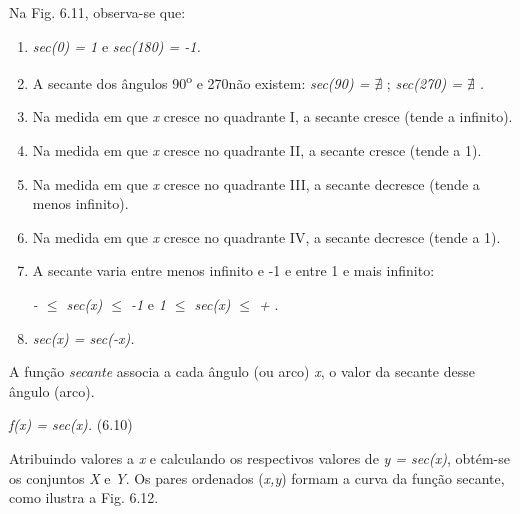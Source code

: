 Na Fig. 6.11, observa-se que:

\begin{caixa}
\begin{enumerate}
    \item \textit{sec(0\degree) = 1}   e  \textit{sec(180\degree) = -1.}

    \item A secante dos ângulos 90\textsuperscript{o} e 270\degree não existem: \textit{sec(90\degree) =  \(  \nexists  \) };  \textit{sec(270\degree) =  \(  \nexists  \) .}

    \item Na medida em que \textit{x} cresce no quadrante I, a secante cresce (tende a infinito).

    \item Na medida em que \textit{x} cresce no quadrante II, a secante cresce (tende a 1).

    \item Na medida em que \textit{x} cresce no quadrante III, a secante decresce (tende a menos infinito).

    \item Na medida em que \textit{x} cresce no quadrante IV, a secante decresce (tende a 1).

    \item A secante varia entre menos infinito e -1 e entre 1 e mais infinito: 

 \textit{-  $ \leq $  sec(x) $ \leq $  -1  }e\textit{   1 $ \leq $  sec(x) $ \leq $  +   }.

    \item \textit{ sec(x) = sec(-x).}
\end{enumerate}
\end{caixa}

\begin{caixa}
A função \textit{secante} associa a cada ângulo (ou arco) \textit{x}, o valor da secante desse ângulo (arco).

\textit{f(x) = sec(x).} \tab (6.10)
\end{caixa}

Atribuindo valores a \textit{x} e calculando os respectivos valores de \textit{y = sec(x)}, obtém-se os conjuntos \textit{X }e\textit{ Y}. Os pares ordenados (\textit{x,y}) formam a curva da função secante, como ilustra a Fig. 6.12.

